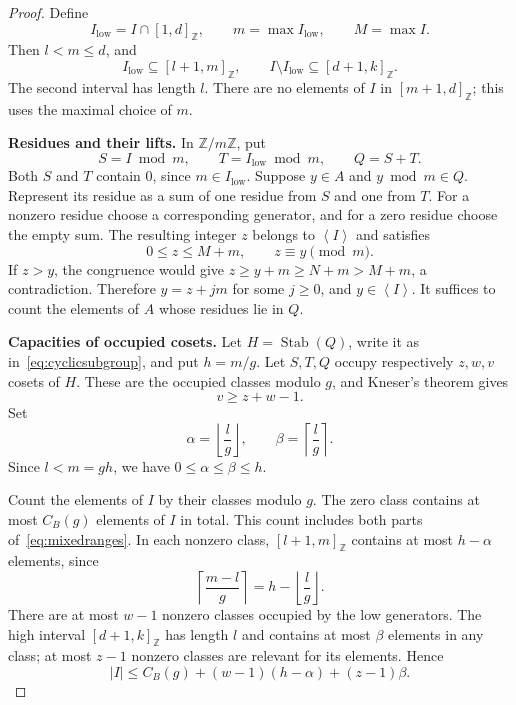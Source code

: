 \documentclass[11pt,a4paper]{article}
\numberwithin{equation}{section}
\theoremstyle{remark}
\newcommand{\Z}{\mathbb Z}
\newcommand{\sg}[1]{\left\langle #1\right\rangle}
\newcommand{\floor}[1]{\left\lfloor #1\right\rfloor}
\newcommand{\ceil}[1]{\left\lceil #1\right\rceil}
\DeclareMathOperator{\Stab}{Stab}
\newcommand{\interval}[2]{[#1,#2]_{\Z}}
\begin{document}
\begin{proof}
Define
\begin{equation}\label{eq:mixedlow}
  I_{\mathrm{low}}=I\cap\interval{1}{d},\qquad
  m=\max I_{\mathrm{low}},\qquad M=\max I.
\end{equation}
Then $l<m\le d$, and
\begin{equation}\label{eq:mixedranges}
  I_{\mathrm{low}}\subseteq\interval{l+1}{m},
  \qquad
  I\setminus I_{\mathrm{low}}\subseteq\interval{d+1}{k}.
\end{equation}
The second interval has length $l$. There are no elements of $I$ in
$\interval{m+1}{d}$; this uses the maximal choice of $m$.

\textbf{Residues and their lifts.}
In $\Z/m\Z$, put
\begin{equation}\label{eq:mixedsumset}
  S=I\bmod m,\qquad T=I_{\mathrm{low}}\bmod m,\qquad Q=S+T.
\end{equation}
Both $S$ and $T$ contain $0$, since $m\in I_{\mathrm{low}}$.
Suppose $y\in A$ and $y\bmod m\in Q$.
Represent its residue as a sum of one residue from $S$ and one from $T$.
For a nonzero residue choose a corresponding generator, and for a zero
residue choose the empty sum. The resulting integer $z$ belongs to
$\sg{I}$ and satisfies
\begin{equation}\label{eq:mixedlift}
  0\le z\le M+m,\qquad z\equiv y\pmod m.
\end{equation}
If $z>y$, the congruence would give
$z\ge y+m\ge N+m>M+m$, a contradiction.
Therefore $y=z+jm$ for some $j\ge0$, and $y\in\sg{I}$.
It suffices to count the elements of $A$ whose residues lie in $Q$.

\textbf{Capacities of occupied cosets.}
Let $H=\Stab(Q)$, write it as in~\eqref{eq:cyclicsubgroup}, and put
$h=m/g$. Let $S,T,Q$ occupy respectively $z,w,v$ cosets of $H$.
These are the occupied classes modulo $g$, and Kneser's theorem gives
\begin{equation}\label{eq:mixedkneser}
  v\ge z+w-1.
\end{equation}
Set
\begin{equation}\label{eq:alphabeta}
  \alpha=\floor{\frac{l}{g}},\qquad
  \beta=\ceil{\frac{l}{g}}.
\end{equation}
Since $l<m=gh$, we have $0\le\alpha\le\beta\le h$.

Count the elements of $I$ by their classes modulo $g$.
The zero class contains at most $C_B(g)$ elements of $I$ in total.
This count includes both parts of~\eqref{eq:mixedranges}.
In each nonzero class, $\interval{l+1}{m}$ contains at most
$h-\alpha$ elements, since
\[
  \ceil{\frac{m-l}{g}}=h-\floor{\frac{l}{g}}.
\]
There are at most $w-1$ nonzero classes occupied by the low generators.
The high interval $\interval{d+1}{k}$ has length $l$ and contains
at most $\beta$ elements in any class; at most $z-1$ nonzero classes
are relevant for its elements. Hence
\begin{equation}\label{eq:mixedupper}
  |I|\le C_B(g)+(w-1)(h-\alpha)+(z-1)\beta.
\end{equation}


\end{proof}
\end{document}
